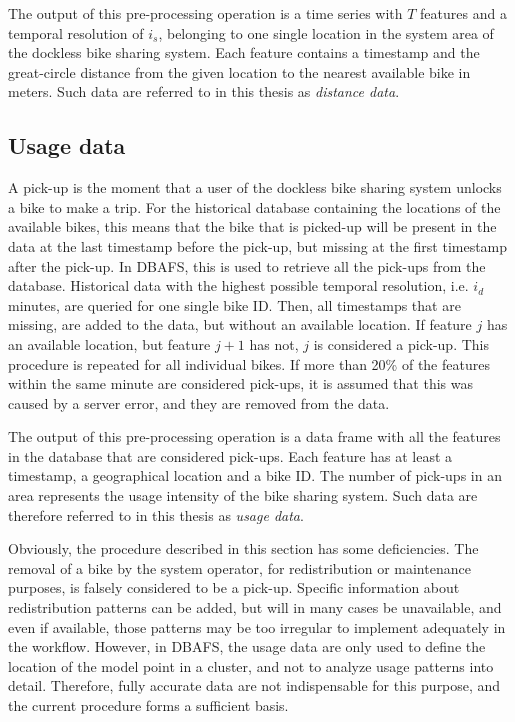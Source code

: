 \documentclass[12pt,oneside]{reedthesis}
\begin{document}
The output of this pre-processing operation is a time series with \(T\)
features and a temporal resolution of \(i_{s}\), belonging to one single
location in the system area of the dockless bike sharing system. Each
feature contains a timestamp and the great-circle distance from the
given location to the nearest available bike in meters. Such data are
referred to in this thesis as \emph{distance data}.

\subsection{Usage data}\label{threefourtwo}

A pick-up is the moment that a user of the dockless bike sharing system
unlocks a bike to make a trip. For the historical database containing
the locations of the available bikes, this means that the bike that is
picked-up will be present in the data at the last timestamp before the
pick-up, but missing at the first timestamp after the pick-up. In DBAFS,
this is used to retrieve all the pick-ups from the database. Historical
data with the highest possible temporal resolution, i.e. \(i_{d}\)
minutes, are queried for one single bike ID. Then, all timestamps that
are missing, are added to the data, but without an available location.
If feature \(j\) has an available location, but feature \(j+1\) has not,
\(j\) is considered a pick-up. This procedure is repeated for all
individual bikes. If more than 20\% of the features within the same
minute are considered pick-ups, it is assumed that this was caused by a
server error, and they are removed from the data.

The output of this pre-processing operation is a data frame with all the
features in the database that are considered pick-ups. Each feature has
at least a timestamp, a geographical location and a bike ID. The number
of pick-ups in an area represents the usage intensity of the bike
sharing system. Such data are therefore referred to in this thesis as
\emph{usage data}.

Obviously, the procedure described in this section has some
deficiencies. The removal of a bike by the system operator, for
redistribution or maintenance purposes, is falsely considered to be a
pick-up. Specific information about redistribution patterns can be
added, but will in many cases be unavailable, and even if available,
those patterns may be too irregular to implement adequately in the
workflow. However, in DBAFS, the usage data are only used to define the
location of the model point in a cluster, and not to analyze usage
patterns into detail. Therefore, fully accurate data are not
indispensable for this purpose, and the current procedure forms a
sufficient basis.
\end{document}
